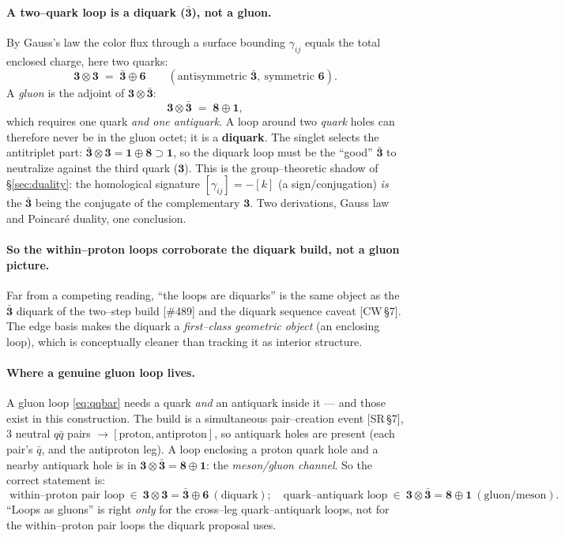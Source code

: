 \documentclass[11pt,oneside]{article}
\newcommand{\bn}{\bar{\mathbf{3}}}
\newcommand{\thr}{\mathbf{3}}
\newcommand{\eg}{\mathbf{8}}
\newcommand{\six}{\mathbf{6}}
\theoremstyle{plain}
\begin{document}
\paragraph{A two--quark loop is a diquark ($\bn$), not a gluon.}
By Gauss's law the color flux through a surface bounding $\gamma_{ij}$ equals the
total enclosed charge, here two quarks:
\begin{equation}
  \thr\otimes\thr \;=\; \bn \oplus \six
  \qquad(\text{antisymmetric }\bn,\ \text{symmetric }\six).
  \label{eq:qq}
\end{equation}
A \emph{gluon} is the adjoint of $\thr\otimes\bn$:
\begin{equation}
  \thr\otimes\bn \;=\; \eg \oplus \mathbf 1 ,
  \label{eq:qqbar}
\end{equation}
which requires one quark \emph{and one antiquark}. A loop around two
\emph{quark} holes can therefore never be in the gluon octet; it is a
\textbf{diquark}. The singlet selects the antitriplet part:
$\bn\otimes\thr=\mathbf 1\oplus\eg\supset\mathbf 1$, so the diquark loop must be
the ``good'' $\bn$ to neutralize against the third quark ($\thr$). This is the
group--theoretic shadow of \S\ref{sec:duality}: the homological signature
$[\gamma_{ij}]=-[k]$ (a sign/conjugation) \emph{is} the $\bn$ being the conjugate
of the complementary $\thr$. Two derivations, Gauss law and Poincar\'e duality,
one conclusion.

\paragraph{So the within--proton loops corroborate the diquark build, not a gluon
picture.} Far from a competing reading, ``the loops are diquarks'' is the same
object as the $\bn$ diquark of the two--step build [\#489] and the diquark
sequence caveat [CW\,\S7]. The edge basis makes the diquark a \emph{first--class
geometric object} (an enclosing loop), which is conceptually cleaner than tracking
it as interior structure.

\paragraph{Where a genuine gluon loop lives.}
A gluon loop \eqref{eq:qqbar} needs a quark \emph{and} an antiquark inside it ---
and those exist in this construction. The build is a simultaneous pair--creation
event [SR\,\S7], $3$ neutral $q\bar q$ pairs $\to[\text{proton},
\text{antiproton}]$, so antiquark holes are present (each pair's $\bar q$, and the
antiproton leg). A loop enclosing a proton quark hole and a nearby antiquark hole
is in $\thr\otimes\bn=\eg\oplus\mathbf 1$: the \emph{meson/gluon channel}. So the
correct statement is:
\begin{equation}
  \boxed{\;\text{within--proton pair loop}\ \in\ \thr\otimes\thr=\bn\oplus\six\ (\text{diquark});
          \quad
          \text{quark--antiquark loop}\ \in\ \thr\otimes\bn=\eg\oplus\mathbf 1\ (\text{gluon/meson}).\;}
\end{equation}
``Loops as gluons'' is right \emph{only} for the cross--leg quark--antiquark loops,
not for the within--proton pair loops the diquark proposal uses.
\end{document}

